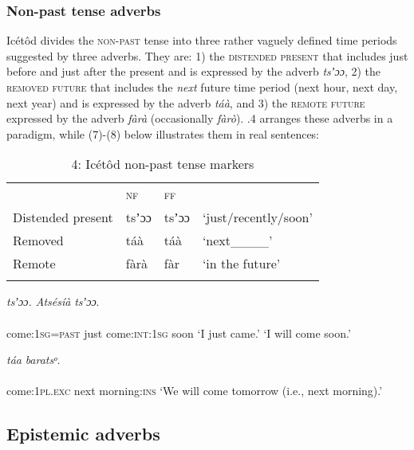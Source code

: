 \subsubsection{Non-past tense adverbs}

Icétôd divides the \textsc{non-past} tense into three rather vaguely defined time periods suggested by three adverbs. They are: 1) the \textsc{distended} \textsc{present} that includes just before and just after the present and is expressed by the adverb \textit{tsʼɔɔ}, 2) the \textsc{removed future} that includes the \textit{next} future time period (next hour, next day, next year) and is expressed by the adverb \textit{táà}, and 3) the \textsc{remote future} expressed by the adverb \textit{fàrà} (occasionally \textit{fàrò}). .4 arranges these adverbs in a paradigm, while (7)-(8) below illustrates them in real sentences:


\begin{table}
\caption{4: Icétôd non-past tense markers}
\label{tab:9}


\begin{tabularx}{\textwidth}{XXXX} & \textsc{nf} & \textsc{ff} & \\
\lsptoprule
Distended present & tsʼɔɔ & tsʼɔɔ & ‘just/recently/soon’\\
Removed & táà & táà & ‘next\_\_\_\_’\\
Remote & fàrà & fàr & ‘in the future’\\
\lspbottomrule
\end{tabularx}
\end{table}



\ea\label{ex:}
     \textit{tsʼɔɔ}\textit{.    Atsésíà}     \textit{tsʼɔɔ}. \\
    \\
come:\textsc{1sg=past}   just    come:\textsc{int:1sg}   soon
\glt ‘I just came.’      ‘I will come soon.’ 
\z




\ea\label{ex:}
     \textit{táa}\textit{   baratsᵒ.} \\
    \\
come:\textsc{1pl.exc}   next   morning:\textsc{ins}
\glt ‘We will come tomorrow (i.e., next morning).’ 
\z






\subsection{Epistemic adverbs}
